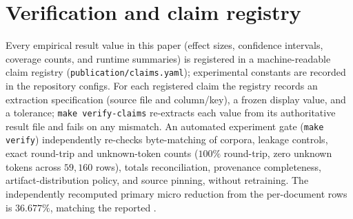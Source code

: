 \section{Verification and claim registry}
\label{app:verify}
Every empirical result value in this paper (effect sizes, confidence intervals,
coverage counts, and runtime summaries) is registered in a machine-readable claim
registry (\texttt{publication/claims.yaml}); experimental constants are recorded in
the repository configs. For each registered claim the registry records an
extraction specification (source file and column/key), a frozen display value, and
a tolerance; \texttt{make verify-claims} re-extracts each value from its
authoritative result file and fails on any mismatch. An automated experiment gate
(\texttt{make verify}) independently re-checks byte-matching of corpora, leakage
controls, exact round-trip and unknown-token counts ($100\%$ round-trip, zero
unknown tokens across $59{,}160$ rows), totals reconciliation, provenance
completeness, artifact-distribution policy, and source pinning, without retraining.
The independently recomputed primary micro reduction from the per-document rows is
$36.677\%$, matching the reported .

